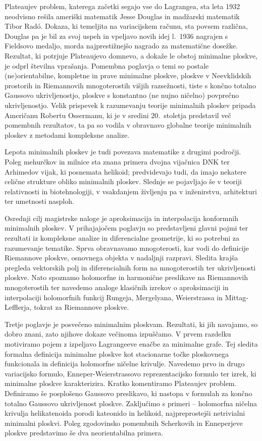 \documentclass[12pt,a4paper,twoside]{article}
\theoremstyle{definition} %
\theoremstyle{plain} %
\numberwithin{equation}{section}  %
\begin{document}
Plateaujev problem, katerega začetki segajo vse do Lagrangea, sta leta 1932 neodvisno rešila ameriški matematik Jesse Douglas in madžarski matematik Tibor Rad\'o. Dokaza, ki temeljita na variacijskem računu, sta povsem različna, Douglas pa je bil za svoj uspeh in vpeljavo novih idej l.~1936 nagrajen s Fieldsovo medaljo, morda najprestižnejšo nagrado za matematične dosežke. Rezultat, ki potrjuje Plateaujevo domnevo, a dokaže le obstoj minimalne ploskve, je odprl številna vprašanja. 
Pomembna poglavja o temi so postale (ne)orientabilne, kompletne in prave minimalne ploskve, ploskve v Neevklidskih prostorih in Riemannovih mnogoterostih višjih razsežnosti, tiste s končno totalno Gaussovo ukrivljenostjo, ploskve s konstantno (ne nujno ničelno) povprečno ukrivljenostjo.
Velik prispevek k razumevanju teorije minimalnih ploskev pripada Američanu Robertu Ossermanu, ki je v sredini 20.~stoletja predstavil več pomembnih rezultatov, ta pa so vodila v obravnavo globalne teorije minimalnih ploskev z metodami kompleksne analize.

Lepota minimalnih ploskev je tudi povezava matematike z drugimi področji. Poleg mehurčkov in milnice sta znana primera dvojna vijačnica DNK ter Arhimedov vijak, ki posnemata helikoid; predvidevajo tudi, da imajo nekatere celične strukture obliko minimalnih ploskev. Slednje se pojavljajo še v teoriji relativnosti in biotehnologiji, v vsakdanjem življenju pa v inženirstvu, arhitekturi ter umetnosti nasploh. \newline

Osrednji cilj magistrske naloge je aproksimacija in interpolacija konformnih minimalnih ploskev.
V prihajajočem poglavju so predstavljeni glavni pojmi ter rezultati iz kompleksne analize in diferencialne geometrije, ki so potrebni za razumevanje tematike. Sprva obravnavamo mnogoterosti, kar vodi do definicije Riemannove ploskve, osnovnega objekta v nadaljnji razpravi. Sledita krajša pregleda vektorskih polj in diferencialnih form na mnogoterostih ter ukrivljenosti ploskve. Nato spoznamo holomorfne in harmonične preslikave na Riemannovih mnogoterostih ter navedemo analoge klasičnih izrekov o aproksimaciji in interpolaciji holomorfnih funkcij Rungeja, Mergelyana, Weierstrassa in Mittag-Lefflerja, tokrat za Riemannove ploskve.

Tretje poglavje je posvečeno minimalnim ploskvam. Rezultati, ki jih navajamo, so dobro znani, zato njihove dokaze večinoma izpuščamo. V prvem razdelku motiviramo pojem z izpeljavo Lagrangeeve enačbe za minimalne grafe. Tej sledita formalna definicija minimalne ploskve kot stacionarne točke ploskovnega funkcionala in definicija holomorfne ničelne krivulje. Navedemo prvo in drugo variacijsko formulo, Enneper-Weierstrassovo reprezentacijsko formulo ter izrek, ki minimalne ploskve karakterizira. Kratko komentiramo Plateaujev problem. Definiramo še posplošeno Gaussovo preslikavo, ki nastopa v formulah za končno totalno Gaussovo ukrivljenost ploskve. Zaključimo s primeri --  holomorfna ničelna krivulja helikatenoida porodi kateonido in helikoid, najpreprostejši netrivialni
 minimalni ploskvi. Poleg zgodovinsko pomembnih Scherkovih in Enneperjeve ploskve predstavimo še dva neorientabilna primera.
\end{document}
